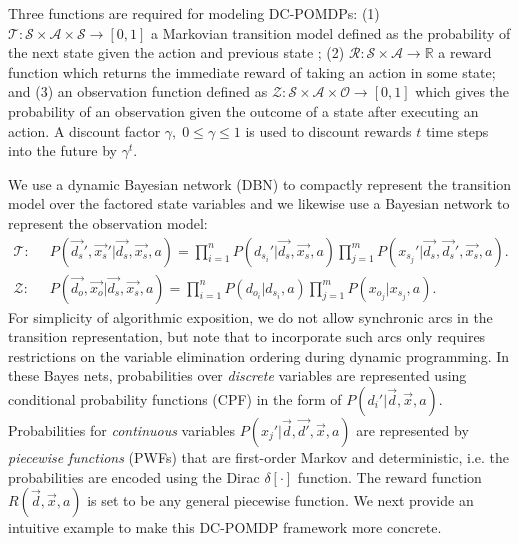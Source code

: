 \documentclass{article} %
\begin{document}
Three functions are required for modeling DC-POMDPs: (1) $\mathcal{T}: \mathcal{S} \times \mathcal{A} \times \mathcal{S} \rightarrow  [ 0, 1 ]$ a Markovian transition model defined as the probability of the next state given the action and previous state%
; (2)  $\mathcal{R}:\mathcal{S}\times\mathcal{A} \rightarrow \mathbb{R}$ a reward function which returns the immediate reward of taking an action in some state; and (3) an observation function defined as $\mathcal{Z} : \mathcal{S} \times \mathcal{A} \times \mathcal{O} \rightarrow [ 0, 1 ]$  which gives the probability of an observation given the outcome of a state after executing an action.  A discount factor $\gamma, \; 0 \leq \gamma \leq 1$ is used to discount rewards $t$ time steps into the future by $\gamma^t$.

We use a dynamic Bayesian network (DBN) to compactly represent the transition model over the factored state variables and we likewise use a Bayesian network to represent the observation model:
{\footnotesize
\begin{align*}
\mathcal{T}: \;\; &
P(\vec{d_s}',\vec{x_s}'|\vec{d_s},\vec{x_s},a) = 
\prod_{i=1}^n P(d_{s_i}'|\vec{d_s},\vec{x_s},a) \prod_{j=1}^m P(x_{s_j}'|\vec{d_s},\vec{d_s}',\vec{x_s},a). \nonumber \\
\mathcal{Z}: \;\; & 
P(\vec{d_o},\vec{x_o}|\vec{d_s},\vec{x_s},a) = 
\prod_{i=1}^n P(d_{o_i}|d_{s_i},a) \prod_{j=1}^m P(x_{o_j}|x_{s_j},a). \nonumber 
\end{align*}}
For simplicity of algorithmic exposition, we do not allow synchronic
arcs in the transition representation, but note that to incorporate
such arcs only requires restrictions on the variable elimination
ordering during dynamic programming.  In these Bayes nets, 
probabilities over 
\emph{discrete} variables are represented using conditional probability
functions (CPF) in the form of
$P(d_i'|\vec{d},\vec{x},a)$. Probabilities for \emph{continuous} variables
$P(x_j'|\vec{d},\vec{d'},\vec{x},a)$ are represented by
\emph{piecewise functions} (PWFs) that are first-order Markov
and deterministic, i.e. the probabilities are encoded using the Dirac
$\delta[\cdot]$ function. The reward function $R(\vec{d},\vec{x},a)$
is set to be any general piecewise function.  We next provide an intuitive
example to make this DC-POMDP framework more concrete.
\end{document}
